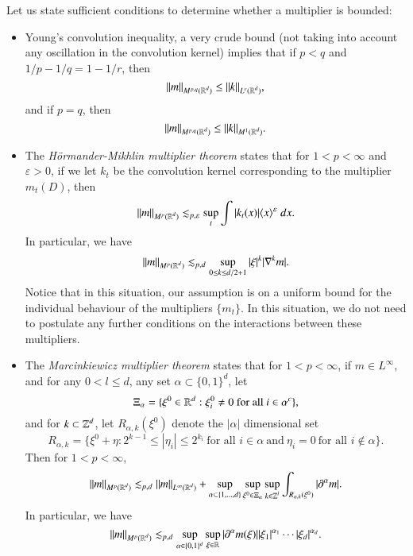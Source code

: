 Let us state sufficient conditions to determine whether a multiplier is bounded:
%
\begin{itemize}
    \item Young's convolution inequality, a very crude bound (not taking into account any oscillation in the convolution kernel) implies that if $p < q$ and $1/p - 1/q = 1 - 1/r$, then
    \[ \| m \|_{M^{p,q}(\operatorname{\mathbb{R}}^d)} \leq \| k \|_{L^r(\operatorname{\mathbb{R}}^d)}, \]
    and if $p = q$, then
    \[ \| m \|_{M^{p,q}(\operatorname{\mathbb{R}}^d)} \leq \| k \|_{M^1(\operatorname{\mathbb{R}}^d)}. \]
%
% 
%
%
%
%

    \item The \emph{H\"{o}rmander-Mikhlin multiplier theorem} states that for $1 < p < \infty$ and $\varepsilon > 0$, if we let $k_t$ be the convolution kernel corresponding to the multiplier $m_t(D)$, then
    \[ \| m \|_{M^p(\operatorname{\mathbb{R}}^d)} \lesssim_{p,\varepsilon} \sup_t \int |k_t(x)| \langle x \rangle^\varepsilon\; dx. \]
    In particular, we have
    \[ \| m \|_{M^p(\operatorname{\mathbb{R}}^d)} \lesssim_{p,d} \sup_{0 \leq k \leq d/2 + 1} |\xi|^k |\nabla^k m|. \]
    Notice that in this situation, our assumption is on a uniform bound for the individual behaviour of the multipliers $\{ m_t \}$. In this situation, we do not need to postulate any further conditions on the interactions between these multipliers.

    \item The \emph{Marcinkiewicz multiplier theorem} states that for $1 < p < \infty$, if $m \in L^\infty$, and for any $0 < l \leq d$, any set $\alpha \subset \{ 0, 1 \}^d$, let
    \[ \Xi_\alpha = \{ \xi^0 \in \operatorname{\mathbb{R}}^d: \xi^0_i \neq 0\ \text{for all $i \in \alpha^c$} \}, \]
    and for $k \subset \operatorname{\mathbb{Z}}^d$, let $R_{\alpha,k}(\xi^0)$ denote the $|\alpha|$ dimensional set
    \[ R_{\alpha, k} = \{ \xi^0 + \eta: 2^{k-1} \leq |\eta_i| \leq 2^{k_i}\ \text{for all $i \in \alpha$}\ \text{and}\ \eta_i = 0\ \text{for all $i \not \in \alpha$} \}. \]
    Then for $1 < p < \infty$,
    \[ \| m \|_{M^p(\operatorname{\mathbb{R}}^d)} \lesssim_{p,d} \| m \|_{L^\infty(\operatorname{\mathbb{R}}^d)} + \sup_{\alpha \subset \{ 1, \dots, d \}} \sup_{\xi^0 \in \Xi_\alpha} \sup_{k \in \operatorname{\mathbb{Z}}^l} \int_{R_{\alpha,k}(\xi^0)} |\partial^\alpha m|. \]
    In particular, we have
    \[ \| m \|_{M^p(\operatorname{\mathbb{R}}^d)} \lesssim_{p,d} \sup_{\alpha \in \{ 0, 1 \}^d} \sup_{\xi \in \operatorname{\mathbb{R}}} |\partial^\alpha m(\xi)| |\xi_1|^{\alpha_1} \cdots |\xi_d|^{\alpha_d}. \]
\end{itemize}
